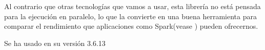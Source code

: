 Al contrario que otras tecnologías que vamos a usar, esta librería no está pensada para la ejecución en paralelo, lo que la convierte en una buena herramienta para comparar el rendimiento que aplicaciones como Spark(vease ) pueden ofrecernos.

Se ha usado en su versión 3.6.13









\begin{comment}
\subsection{Maven o sbt}


\subsection{}


\end{comment}
